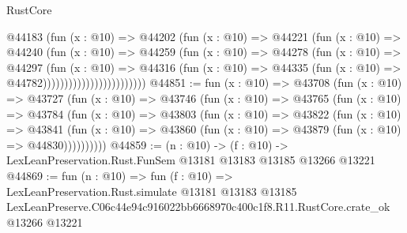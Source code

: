 \begin{lexlean}{RustCore}
\begin{coremodule}
                                @44183
                                  (fun (x : @10) =>
                                  @44202
                                    (fun (x : @10) =>
                                    @44221
                                      (fun (x : @10) =>
                                      @44240
                                        (fun (x : @10) =>
                                        @44259
                                          (fun (x : @10) =>
                                          @44278
                                            (fun (x : @10) =>
                                            @44297
                                              (fun (x : @10) =>
                                              @44316
                                                (fun (x : @10) =>
                                                @44335
                                                  (fun (x : @10) => @44782))))))))))))))))))))))))
@44851 := fun (x : @10) =>
  @43708
    (fun (x : @10) =>
    @43727
      (fun (x : @10) =>
      @43746
        (fun (x : @10) =>
        @43765
          (fun (x : @10) =>
          @43784
            (fun (x : @10) =>
            @43803
              (fun (x : @10) =>
              @43822
                (fun (x : @10) =>
                @43841
                  (fun (x : @10) =>
                  @43860 (fun (x : @10) => @43879 (fun (x : @10) => @44830))))))))))
@44859 := (n : @10) ->
  (f : @10) -> LexLeanPreservation.Rust.FunSem @13181 @13183 @13185 @13266 @13221
@44869 := fun (n : @10) =>
  fun (f : @10) =>
  LexLeanPreservation.Rust.simulate
    @13181
    @13183
    @13185
    LexLeanPreserve.C06c44e94c916022bb6668970c400c1f8.R11.RustCore.crate_ok
    @13266
    @13221
\end{coremodule}
\end{lexlean}
